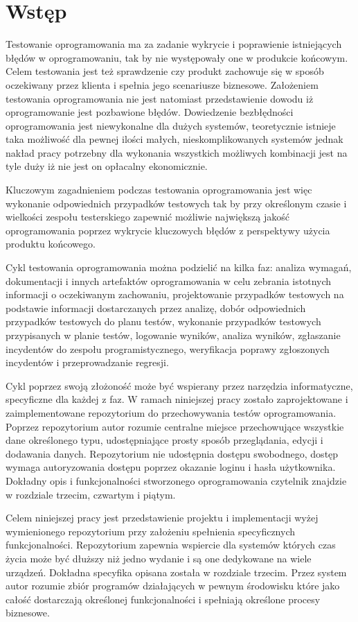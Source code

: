 \chapter{Wstęp}
Testowanie oprogramowania ma za zadanie wykrycie i poprawienie istniejących błędów w oprogramowaniu, tak by nie występowały one w produkcie końcowym. Celem testowania jest też sprawdzenie czy produkt zachowuje się w sposób oczekiwany przez klienta i spełnia jego scenariusze biznesowe. Założeniem testowania oprogramowania nie jest natomiast przedstawienie dowodu iż oprogramowanie jest pozbawione błędów. Dowiedzenie bezbłędności oprogramowania jest niewykonalne dla dużych systemów, teoretycznie istnieje taka możliwość dla pewnej ilości małych, nieskomplikowanych systemów jednak nakład pracy potrzebny dla wykonania wszystkich możliwych kombinacji jest na tyle duży iż nie jest on opłacalny ekonomicznie. 

Kluczowym zagadnieniem podczas testowania oprogramowania jest więc wykonanie odpowiednich przypadków testowych tak by przy określonym czasie i wielkości zespołu testerskiego zapewnić możliwie największą jakość oprogramowania poprzez wykrycie kluczowych błędów z perspektywy użycia produktu końcowego.  

Cykl testowania oprogramowania można podzielić na kilka faz: analiza wymagań, dokumentacji i innych artefaktów oprogramowania w celu zebrania istotnych informacji o oczekiwanym zachowaniu, projektowanie przypadków testowych na podstawie informacji dostarczanych przez analizę, dobór odpowiednich przypadków testowych do planu testów, wykonanie przypadków testowych przypisanych w planie testów, logowanie wyników, analiza wyników, zgłaszanie incydentów do zespołu programistycznego, weryfikacja poprawy zgłoszonych incydentów i przeprowadzanie regresji.

Cykl poprzez swoją złożoność może być wspierany przez narzędzia informatyczne, specyficzne dla każdej z faz. W ramach niniejszej pracy zostało zaprojektowane i zaimplementowane repozytorium do przechowywania testów oprogramowania. Poprzez repozytorium autor rozumie centralne miejsce przechowujące wszystkie dane określonego typu, udostępniające prosty sposób przeglądania, edycji i dodawania danych. Repozytorium nie udostępnia dostępu swobodnego, dostęp wymaga autoryzowania dostępu poprzez okazanie loginu i hasła użytkownika. Dokładny opis i funkcjonalności stworzonego oprogramowania czytelnik znajdzie w rozdziale trzecim, czwartym i piątym. 

Celem niniejszej pracy jest przedstawienie projektu i implementacji wyżej wymienionego repozytorium przy założeniu spełnienia specyficznych funkcjonalności. Repozytorium zapewnia wspiercie dla systemów których czas życia może być dłuższy niż jedno wydanie i są one dedykowane na wiele urządzeń. Dokładna specyfika opisana została w rozdziale trzecim. Przez system autor rozumie zbiór programów działających w pewnym środowisku które jako całość dostarczają określonej funkcjonalności i spełniają określone procesy biznesowe. 
